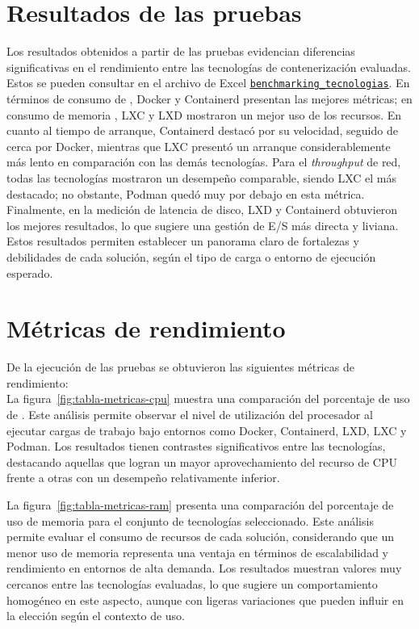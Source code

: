 \section{Resultados de las pruebas}
\noindent
Los resultados obtenidos a partir de las pruebas evidencian diferencias significativas en el rendimiento entre las tecnologías de contenerización evaluadas. Estos se pueden consultar en el archivo de Excel \underline{\href{https://docs.google.com/spreadsheets/d/1Ce37Sm3Swyfa88Ur1yQbLarq_D86obUIAGGJocgQbUE/edit?usp=sharing} {\texttt{benchmarking\_tecnologias}}}.
En términos de consumo de \CPU, Docker y Containerd presentan las mejores métricas; en consumo de memoria \RAM, LXC y LXD mostraron un mejor uso de los recursos. En cuanto al tiempo de arranque, Containerd destacó por su velocidad, seguido de cerca por Docker, mientras que LXC presentó un arranque considerablemente más lento en comparación con las demás tecnologías.
Para el \textit{throughput} de red, todas las tecnologías mostraron un desempeño comparable, siendo LXC el más destacado; no obstante, Podman quedó muy por debajo en esta métrica. Finalmente, en la medición de latencia de disco, LXD y Containerd obtuvieron los mejores resultados, lo que sugiere una gestión de E/S más directa y liviana.
Estos resultados permiten establecer un panorama claro de fortalezas y debilidades de cada solución, según el tipo de carga o entorno de ejecución esperado.

\section{Métricas de rendimiento}
\noindent
De la ejecución de las pruebas se obtuvieron las siguientes métricas de rendimiento: \\

\noindent
La figura~\ref{fig:tabla-metricas-cpu} muestra una comparación del porcentaje de uso de \CPU. Este análisis permite observar el nivel de utilización del procesador al ejecutar cargas de trabajo bajo entornos como Docker, Containerd, LXD, LXC y Podman. Los resultados tienen contrastes significativos entre las tecnologías, destacando aquellas que logran un mayor aprovechamiento del recurso de CPU frente a otras con un desempeño relativamente inferior.


\noindent
La figura~\ref{fig:tabla-metricas-ram} presenta una comparación del porcentaje de uso de memoria \RAM para el conjunto de tecnologías seleccionado. Este análisis permite evaluar el consumo de recursos de cada solución, considerando que un menor uso de memoria representa una ventaja en términos de escalabilidad y rendimiento en entornos de alta demanda. Los resultados muestran valores muy cercanos entre las tecnologías evaluadas, lo que sugiere un comportamiento homogéneo en este aspecto, aunque con ligeras variaciones que pueden influir en la elección según el contexto de uso.


